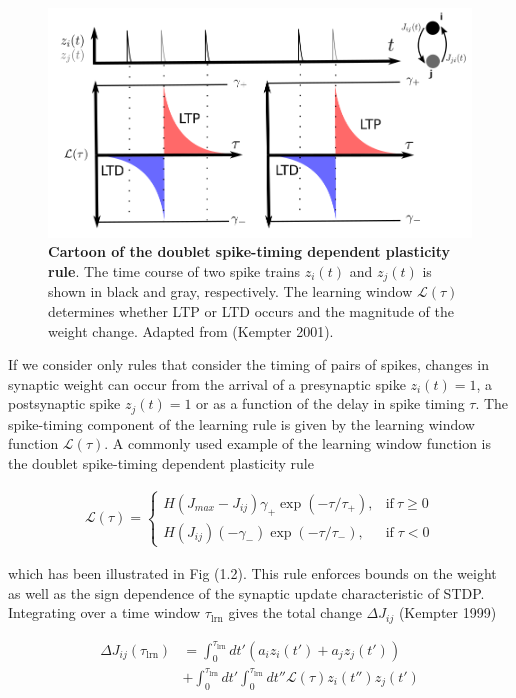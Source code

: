 \documentclass{ucetd}
\begin{document}
\begin{figure}[t!]
\centering
\includegraphics[width=150mm]{figure-5}
\caption{\textbf{Cartoon of the doublet spike-timing dependent plasticity rule}. The time course of two spike trains $z_{i}(t)$ and $z_{j}(t)$ is shown in black and gray, respectively. The learning window $\mathcal{L}(\tau)$ determines whether LTP or LTD occurs and the magnitude of the weight change. Adapted from (Kempter 2001).}
\end{figure}


If we consider only rules that consider the timing of pairs of spikes, changes in synaptic weight can occur from the arrival of a presynaptic spike $z_{i}(t) = 1$, a postsynaptic spike $z_{j}(t) = 1$ or as a function of the delay in spike timing  $\tau$. The spike-timing component of the learning rule is given by the learning window function $\mathcal{L}(\tau)$. A commonly used example of the learning window function is the doublet spike-timing dependent plasticity rule

\begin{align}
\mathcal{L}(\tau) = \begin{cases}
      H(J_{max}-J_{ij})\gamma_{+}\exp(-\tau/\tau_{+}), & \text{if}\ \tau \geq 0 \\
       H(J_{ij})(-\gamma_{-})\exp(-\tau/\tau_{-}), & \text{if} \; \tau < 0
    \end{cases}
\end{align}


which has been illustrated in Fig (1.2). This rule enforces bounds on the weight as well as the sign dependence of the synaptic update characteristic of STDP. Integrating over a time window $\tau_{\mathrm{lrn}}$ gives the total change $\Delta J_{ij}$ (Kempter 1999)


\begin{align}
\Delta J_{ij}(\tau_{\mathrm{lrn}}) &= \int_{0}^{\tau_{\mathrm{lrn}}} dt'\left(a_{i}z_{i}(t') + a_{j}z_{j}(t')\right) \\
&+ \int_{0}^{\tau_{\mathrm{lrn}}} dt'\int_{0}^{\tau_{\mathrm{lrn}}} dt''\mathcal{L}(\tau)z_{i}(t'')z_{j}(t')
\end{align}
\end{document}
